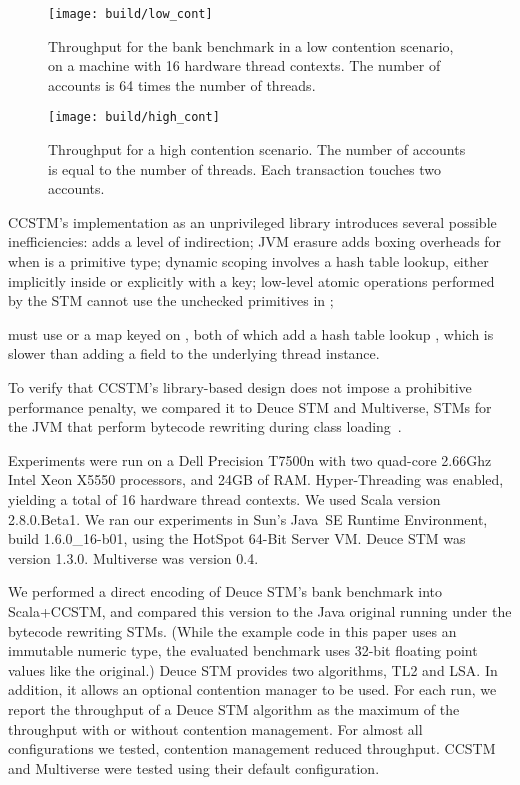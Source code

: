 
\begin{figure}
  \centering \texttt{[image: build/low\_cont]}

\caption{Throughput for the bank benchmark in a low contention scenario,
on a machine with 16 hardware thread contexts.  The number of accounts
is 64 times the number of threads.}

  \label{fig:lowcont}
\end{figure}

\begin{figure}
  \centering \texttt{[image: build/high\_cont]}

\caption{Throughput for a high contention scenario.  The number of accounts is
equal to the number of threads.  Each transaction touches two accounts.}

  \label{fig:highcont}
\end{figure}

CCSTM's implementation as an unprivileged library introduces several possible inefficiencies:
 adds a level of indirection;
JVM erasure adds boxing overheads for  when  is a
primitive type; dynamic scoping involves a hash table lookup, either implicitly
inside  or explicitly with a  key; low-level
atomic operations performed by the STM cannot use the unchecked primitives in
; 

must use  or a map keyed on
, both of which add a hash table lookup , which is slower
than adding a field to the underlying thread instance.


To verify that CCSTM's library-based design does not impose a prohibitive
performance penalty, we compared it to Deuce STM and Multiverse, STMs for
the JVM that perform bytecode rewriting during class
loading~\cite{deucestm,multiverse}.

Experiments were run on a Dell Precision T7500n with two quad-core
2.66Ghz Intel Xeon X5550 processors, and 24GB of RAM.  Hyper-Threading was
enabled, yielding a total of 16 hardware thread contexts.  We used Scala
version 2.8.0.Beta1.  We ran our experiments in
Sun's Java~SE Runtime Environment, build 1.6.0\_16-b01, using the HotSpot
64-Bit Server VM.  Deuce STM was version 1.3.0.  Multiverse was version 0.4.

We performed a direct encoding of Deuce STM's bank benchmark into
Scala+CCSTM, and compared this version to the Java original running
under the bytecode rewriting STMs.  (While the example code in this paper uses an
immutable  numeric type, the evaluated benchmark uses 32-bit
floating point values like the original.)  Deuce STM provides two algorithms,
TL2 and LSA.  In addition, it allows an optional contention manager to
be used.  For each run, we report the throughput of a Deuce STM algorithm
as the maximum of the throughput with or without contention management.
For almost all configurations we tested, contention management reduced
throughput.  CCSTM and Multiverse were tested using their default
configuration.

